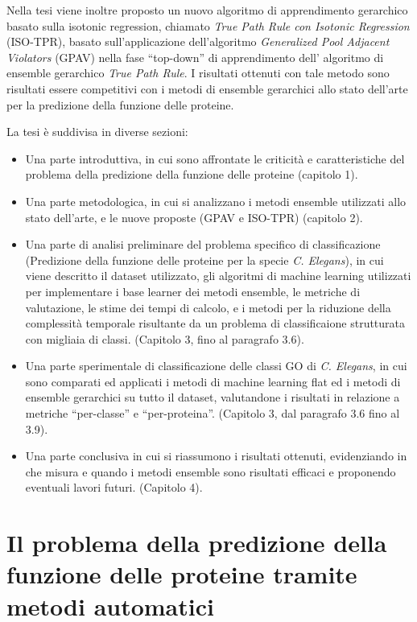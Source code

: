 \documentclass[12pt]{report}
\begin{document}
Nella tesi viene inoltre proposto un nuovo algoritmo di apprendimento gerarchico basato sulla isotonic regression, chiamato \emph{True Path Rule con Isotonic Regression} (ISO-TPR),
basato sull'applicazione dell'algoritmo \emph{Generalized Pool Adjacent Violators} (GPAV) nella fase ``top-down'' di apprendimento dell' algoritmo di ensemble gerarchico \emph{True Path Rule}. I risultati ottenuti con tale metodo sono risultati essere competitivi con i metodi di ensemble gerarchici allo stato dell'arte per la predizione della funzione delle proteine.

La tesi \`e suddivisa in diverse sezioni:

\begin{itemize}
\item Una parte introduttiva, in cui sono affrontate le criticit\`a e caratteristiche del problema della predizione della funzione delle proteine (capitolo 1). 
\item Una parte metodologica, in cui si analizzano i metodi ensemble utilizzati allo stato dell'arte, e le nuove proposte (GPAV e ISO-TPR) (capitolo 2).
\item Una parte di analisi preliminare del problema specifico di classificazione (Predizione della funzione delle proteine per la specie \emph{C. Elegans}), in cui viene descritto il dataset utilizzato, gli algoritmi di machine learning utilizzati per implementare i base learner dei metodi ensemble, le metriche di valutazione, le stime dei tempi di calcolo, e i metodi per la riduzione della complessit\`a temporale risultante da un problema di classificaione strutturata con migliaia di classi. (Capitolo 3, fino al paragrafo 3.6).
\item Una parte sperimentale di classificazione delle classi GO di \emph{C. Elegans}, in cui sono comparati ed applicati i metodi di machine learning flat ed i metodi di ensemble gerarchici su tutto il dataset, valutandone i risultati in relazione a metriche ``per-classe''  e ``per-proteina''. (Capitolo 3, dal paragrafo 3.6 fino al 3.9).
\item Una parte conclusiva in cui si riassumono i risultati ottenuti, evidenziando in che misura e quando i metodi ensemble sono risultati efficaci e proponendo eventuali lavori futuri. (Capitolo 4).
\end{itemize}
\tableofcontents


\chapter{Il problema della predizione della funzione delle proteine tramite metodi automatici}
\end{document}
